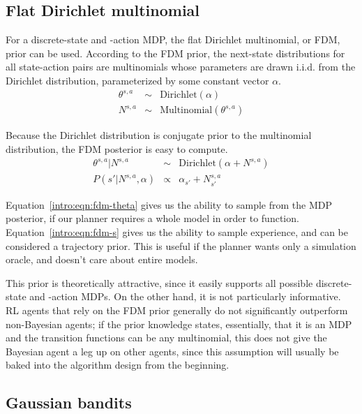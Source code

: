 \subsection{Flat Dirichlet multinomial}

\label{intro:fdm}

For a discrete-state and -action MDP, the flat Dirichlet multinomial, or FDM, prior can be used. According to the FDM prior, the next-state distributions for all state-action pairs are multinomials whose parameters are drawn i.i.d. from the Dirichlet distribution, parameterized by some constant vector $\alpha$.
\begin{eqnarray}
\theta^{s,a} &\sim& \mbox{Dirichlet}(\alpha)\\
N^{s,a} &\sim& \mbox{Multinomial}(\theta^{s,a})
\end{eqnarray}

Because the Dirichlet distribution is conjugate prior to the multinomial distribution, the FDM posterior is easy to compute.
\begin{eqnarray}
\label{intro:eqn:fdm-theta}\theta^{s,a}|N^{s,a} &\sim& \mbox{Dirichlet}(\alpha+N^{s,a})\\
\label{intro:eqn:fdm-s}P(s'|N^{s,a},\alpha) &\propto& \alpha_{s'}+N^{s,a}_{s'}
\end{eqnarray}

Equation~\ref{intro:eqn:fdm-theta} gives us the ability to sample from the MDP posterior, if our planner requires a whole model in order to function. Equation~\ref{intro:eqn:fdm-s} gives us the ability to sample experience, and can be considered a trajectory prior. This is useful if the planner wants only a simulation oracle, and doesn't care about entire models.

This prior is theoretically attractive, since it easily supports all possible discrete-state and -action MDPs. On the other hand, it is not particularly informative. RL agents that rely on the FDM prior generally do not significantly outperform non-Bayesian agents; if the prior knowledge states, essentially, that it is an MDP and the transition functions can be any multinomial, this does not give the Bayesian agent a leg up on other agents, since this assumption will usually be baked into the algorithm design from the beginning.

\subsection{Gaussian bandits}

